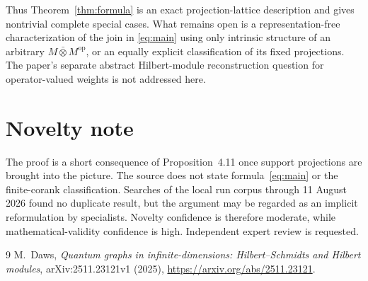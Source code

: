 \documentclass[11pt]{article}
\begin{document}
Thus Theorem~\ref{thm:formula} is an exact projection-lattice description
and gives nontrivial complete special cases.  What remains open is a
representation-free characterization of the join in \eqref{eq:main} using
only intrinsic structure of an arbitrary $M\bar\otimes M^{\mathrm{op}}$,
or an equally explicit classification of its fixed projections.  The
paper's separate abstract Hilbert-module reconstruction question for
operator-valued weights is not addressed here.

\section{Novelty note}

The proof is a short consequence of Proposition~4.11 once support
projections are brought into the picture.  The source does not state
formula~\eqref{eq:main} or the finite-corank classification.  Searches of
the local run corpus through 11 August 2026 found no duplicate result, but
the argument may be regarded as an implicit reformulation by specialists.
Novelty confidence is therefore moderate, while mathematical-validity
confidence is high.  Independent expert review is requested.

\begin{thebibliography}{9}
M.~Daws,
\emph{Quantum graphs in infinite-dimensions: Hilbert--Schmidts and Hilbert
modules}, arXiv:2511.23121v1 (2025),
\url{https://arxiv.org/abs/2511.23121}.
\end{thebibliography}
\end{document}
